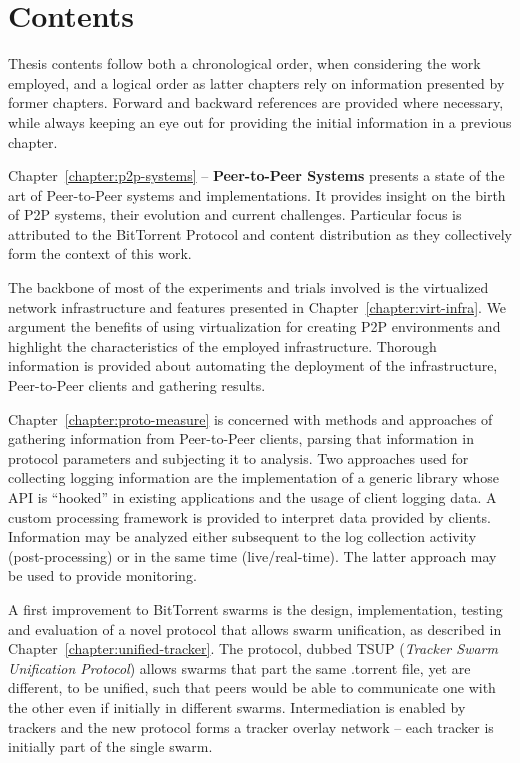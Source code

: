 \section{Contents}
\label{sec:intro:contents}

Thesis contents follow both a chronological order, when considering the work
employed, and a logical order as latter chapters rely on information presented
by former chapters. Forward and backward references are provided where
necessary, while always keeping an eye out for providing the initial
information in a previous chapter.

Chapter~\ref{chapter:p2p-systems} -- \textbf{Peer-to-Peer Systems} presents a
state of the art of Peer-to-Peer systems and implementations. It provides
insight on the birth of P2P systems, their evolution and current challenges.
Particular focus is attributed to the BitTorrent Protocol and content
distribution as they collectively form the context of this work.

The backbone of most of the experiments and trials involved is the
virtualized network infrastructure and features presented in
Chapter~\ref{chapter:virt-infra}. We argument the benefits of using
virtualization for creating P2P environments and highlight the characteristics
of the employed infrastructure. Thorough information is provided about
automating the deployment of the infrastructure, Peer-to-Peer clients and
gathering results.

Chapter~\ref{chapter:proto-measure} is concerned with methods and approaches
of gathering information from Peer-to-Peer clients, parsing that information
in protocol parameters and subjecting it to analysis. Two approaches used for
collecting logging information are the implementation of a generic library
whose API is ``hooked'' in existing applications and the usage of client
logging data. A custom processing framework is provided to interpret data
provided by clients. Information may be analyzed either subsequent to the log
collection activity (post-processing) or in the same time (live/real-time).
The latter approach may be used to provide monitoring.

A first improvement to BitTorrent swarms is the design, implementation,
testing and evaluation of a novel protocol that allows swarm unification, as
described in Chapter~\ref{chapter:unified-tracker}. The protocol, dubbed TSUP
(\textit{Tracker Swarm Unification Protocol}) allows swarms that part the same
.torrent file, yet are different, to be unified, such that peers would be able
to communicate one with the other even if initially in different swarms.
Intermediation is enabled by trackers and the new protocol forms a tracker
overlay network -- each tracker is initially part of the single swarm.


